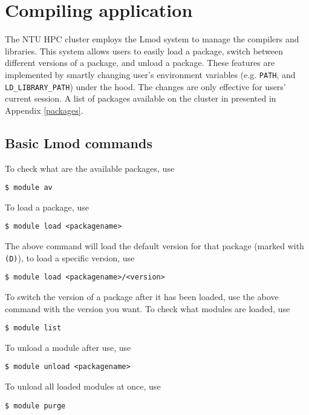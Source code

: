 \section{Compiling application}

The NTU HPC cluster employs the Lmod system to manage the compilers and libraries. This system allows users to easily load a package, switch between different versions of a package, and unload a package. These features are implemented by smartly changing user's environment variables (e.g. \lstinline{PATH}, and \lstinline{LD_LIBRARY_PATH}) under the hood. The changes are only effective for users' current session. A list of packages available on the cluster in presented in Appendix \ref{packages}.

\subsection{Basic Lmod commands}

To check what are the available packages, use

\begin{lstlisting}
$ module av
\end{lstlisting}

\noindent To load a package, use

\begin{lstlisting}
$ module load <packagename>
\end{lstlisting}

\noindent The above command will load the default version for that package (marked with \lstinline{(D)}), to load a specific version, use

\begin{lstlisting}
$ module load <packagename>/<version>
\end{lstlisting}

\noindent To switch the version of a package after it has been loaded, use the above command with the version you want. To check what modules are loaded, use

\begin{lstlisting}
$ module list
\end{lstlisting}

\noindent To unload a module after use, use

\begin{lstlisting}
$ module unload <packagename>
\end{lstlisting}

\noindent To unload all loaded modules at once, use

\begin{lstlisting}
$ module purge
\end{lstlisting}